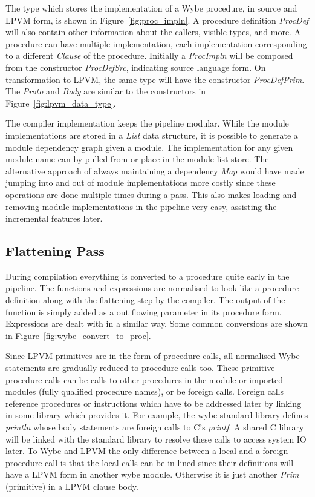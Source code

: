 The type which stores the implementation of a Wybe procedure, in source and
LPVM form, is shown in Figure~\ref{fig:proc_impln}. A procedure definition
\textit{ProcDef} will also contain other information about the callers, visible
types, and more. A procedure can have multiple implementation, each
implementation corresponding to a different \textit{Clause} of the
procedure. Initially a \textit{ProcImpln} will be composed from the constructor
\textit{ProcDefSrc}, indicating source language form. On transformation to
LPVM, the same type will have the constructor \textit{ProcDefPrim}. The
\textit{Proto} and \textit{Body} are similar to the constructors in
Figure~\ref{fig:lpvm_data_type}.

The compiler implementation keeps the pipeline modular. While the module
implementations are stored in a \textit{List} data structure, it is possible to
generate a module dependency graph given a module. The implementation for any
given module name can by pulled from or place in the module list store. The
alternative approach of always maintaining a dependency \textit{Map} would have
made jumping into and out of module implementations more costly since these
operations are done multiple times during a pass. This also makes loading and
removing module implementations in the pipeline very easy, assisting the
incremental features later.



\subsection{Flattening Pass}

During compilation everything is converted to a procedure quite early
in the pipeline. The functions and expressions are normalised to look like a
procedure definition along with the flattening step by the compiler. The output
of the function is simply added as a out flowing parameter in its procedure
form. Expressions are dealt with in a similar way.  Some common conversions are
shown in Figure~\ref{fig:wybe_convert_to_proc}.

Since LPVM primitives are in the form of procedure calls, all normalised Wybe
statements are gradually reduced to procedure calls too. These primitive
procedure calls can be calls to other procedures in the module or imported
modules (fully qualified procedure names), or be foreign calls. Foreign calls
reference procedures or instructions which have to be addressed later by
linking in some library which provides it. For example, the wybe standard
library defines \textit{println} whose body statements are foreign calls to C's
\textit{printf}. A shared C library will be linked with the standard library to
resolve these calls to access system IO later. To Wybe and LPVM the only
difference between a local and a foreign procedure call is that the local calls
can be in-lined since their definitions will have a LPVM form in another wybe
module. Otherwise it is just another \textit{Prim} (primitive) in a LPVM clause
body.

